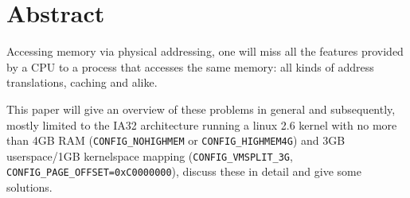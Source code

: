 %
%

\section{Abstract}

Accessing memory via physical addressing, one will miss all the features
provided by a CPU to a process that accesses the same memory: all kinds of
address translations, caching and alike.

This paper will give an overview of these problems in general and subsequently,
mostly limited to the IA32 architecture running a linux 2.6 kernel with no more
than 4GB RAM (\texttt{CONFIG\_NOHIGHMEM} or \texttt{CONFIG\_HIGHMEM4G}) and 3GB
userspace/1GB kernelspace mapping (\texttt{CONFIG\_VMSPLIT\_3G},
\texttt{CONFIG\_PAGE\_OFFSET=0xC0000000}), discuss these in detail and give some
solutions. \label{ia32_config_options}





